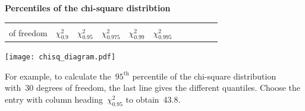\documentclass[a4paper]{article}
\begin{document}
\begin{center}
  {\Large\bf Percentiles of the chi-square distribtion}
\end{center}

\rule{0mm}{5mm}
\pagestyle{empty}
\thispagestyle{empty}
\begin{table}[ht]
\centering
\begin{tabular}{r|llllllllll}
  \begin{minipage}{20mm}degrees\\of freedom\end{minipage}
  & {\Large $\chi^2_{0.9}$}
  & {\Large $\chi^2_{0.95}$}
  & {\Large $\chi^2_{0.975}$}
  & {\Large $\chi^2_{0.99}$}
  & {\Large $\chi^2_{0.995}$}
  \rule[-4mm]{0mm}{10mm}
  \\  \hline

  \hline
\end{tabular}
\end{table}

\begin{centering}
\texttt{[image: chisq\_diagram.pdf]}
\end{centering}

\noindent For example, to calculate the~$95^\mathrm{th}$ percentile of
the chi-square distribution with~30 degrees of freedom, the last line
gives the different quantiles.  Choose the entry with column
heading~$\chi^2_{0.95}$ to obtain~43.8.
\\
\end{document}

